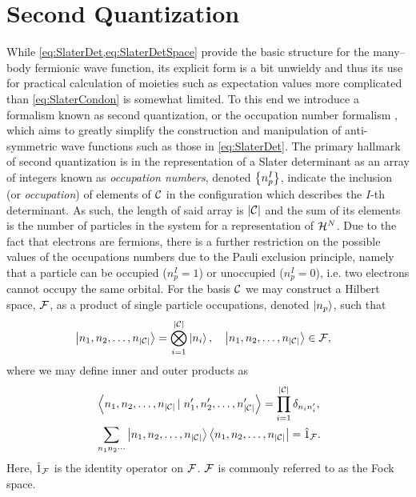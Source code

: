 \section{Second Quantization}
\label{sec:SQ}

While \cref{eq:SlaterDet,eq:SlaterDetSpace} provide the basic structure for the many--body fermionic wave function, its explicit form
is a bit unwieldy and thus its use for practical calculation of moieties such as expectation values more complicated than \cref{eq:SlaterCondon} 
is somewhat limited.
To this end we introduce a formalism known as second quantization, or the occupation number formalism \cite{Walecka12_book,Schuck04_book,Ostlund12_book},
which aims to greatly simplify the construction and manipulation of anti-symmetric wave functions such as those in 
\cref{eq:SlaterDet}. The primary hallmark of second quantization is in the representation of a Slater determinant
as an array of integers known as \emph{occupation numbers}, denoted $\left \lbrace n_p^I \right\rbrace$, indicate the inclusion (or \emph{occupation}) of elements
of $\mathcal{C}$ in the configuration which describes the $I$-th determinant. As such, the length of said array is $\vert \mathcal{C} \vert$
and the sum of its elements is the number of particles in the system for a representation of $\mathcal{H}^N$. Due to the fact that electrons are fermions,
there is a further restriction on the possible values of the occupations numbers due to the Pauli exclusion principle,
namely that a particle can be occupied ($n^I_p=1$) or unoccupied ($n^I_p=0$), i.e. two electrons cannot occupy the same orbital. 
For the basis $\mathcal{C}$ we may construct a Hilbert space, $\mathcal{F}$, as a product of single particle occupations, denoted $\left\vert n_p \right\rangle$, such that \cite{Walecka12_book}
\begin{align}
&\left\vert n_1,n_2,\ldots,n_{\vert\mathcal{C}\vert} \right\rangle = \bigotimes_{i=1}^{\vert \mathcal{C} \vert} \left\vert n_i \right\rangle, 
  \quad \left\vert n_1,n_2,\ldots,n_{\vert\mathcal{C}\vert} \right\rangle \in \mathcal{F},
\end{align}
where we may define inner and outer products as
\begin{subequations}
  \label{eq:OccOrthoComp}
\begin{align}
&\left\langle n_1,n_2,\ldots,n_{\vert\mathcal{C}\vert} \left\vert\right. n'_1,n'_2,\ldots,n'_{\vert\mathcal{C}\vert} \right\rangle = \prod_{i = 1}^{\vert\mathcal{C}\vert} \delta_{n_i n_i'},\\
&\sum_{n_1n_2\cdots} \left\vert n_1,n_2,\ldots,n_{\vert\mathcal{C}\vert} \right\rangle\left\langle n_1,n_2,\ldots,n_{\vert\mathcal{C}\vert} \right\vert = \hat{1}_{\mathcal{F}}.
\end{align}
\end{subequations}
Here, $\hat{1}_{\mathcal{F}}$ is the identity operator on $\mathcal{F}$. $\mathcal{F}$ is commonly referred to as the Fock space.

